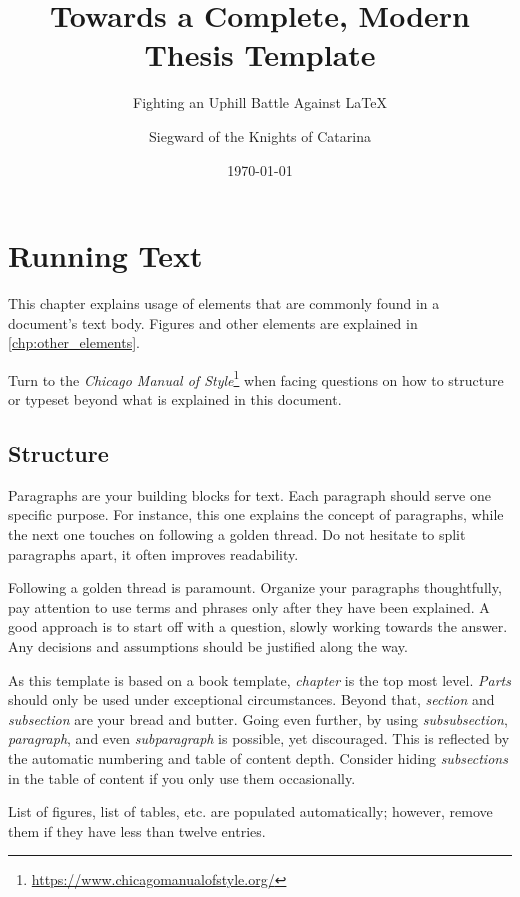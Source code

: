 \documentclass[parskip=half]{scrbook}
\title{Towards a Complete, Modern Thesis Template}
\subtitle{Fighting an Uphill Battle Against \LaTeX}
\author{Siegward of the Knights of Catarina}
\date{\today}
\providecommand{\listoflistings}{\lstlistoflistings}
\begin{document}
\frontmatter
\maketitle

\tableofcontents
\listoffigures
\listoftables
\listofalgorithms
\listoflistings


\mainmatter
\chapter{Running Text}
\label{chp:running_text}

This chapter explains usage of elements that are commonly found in a document's text body.
Figures and other elements are explained in \cref{chp:other_elements}.

Turn to the \emph{Chicago Manual of Style}\footnote{\url{https://www.chicagomanualofstyle.org/}} when facing questions on how to structure or typeset beyond what is explained in this document.

\section{Structure}

Paragraphs are your building blocks for text.
Each paragraph should serve one specific purpose.
For instance, this one explains the concept of paragraphs, while the next one touches on following a golden thread.
Do not hesitate to split paragraphs apart, it often improves readability.

Following a golden thread is paramount.
Organize your paragraphs thoughtfully, pay attention to use terms and phrases only after they have been explained.
A good approach is to start off with a question, slowly working towards the answer.
Any decisions and assumptions should be justified along the way.

As this template is based on a book template, \emph{chapter} is the top most level.
\emph{Parts} should only be used under exceptional circumstances.
Beyond that, \emph{section} and \emph{subsection} are your bread and butter.
Going even further, by using \emph{subsubsection}, \emph{paragraph}, and even \emph{subparagraph} is possible, yet discouraged.
This is reflected by the automatic numbering and table of content depth.
Consider hiding \emph{subsections} in the table of content if you only use them occasionally.

List of figures, list of tables, etc. are populated automatically; however, remove them if they have less than twelve entries.
\end{document}
